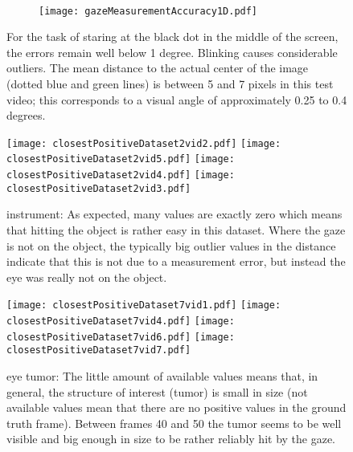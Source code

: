 \begin{figure}[ht]
	\centering
	\begin{subfigure}[h]{0.41\textwidth}
	      \setlength{\fboxsep}{0pt}%
	      \setlength{\fboxrule}{0.5pt}%
	      \centering
	\end{subfigure}
	~
	\begin{subfigure}[h]{0.48\textwidth}
		\texttt{[image: gazeMeasurementAccuracy1D.pdf]}	
	\end{subfigure}
	\caption{For the task of staring at the black dot in the middle of the screen, the errors remain well below 1 degree. Blinking causes considerable outliers. The mean distance to the actual center of the image (dotted blue and green lines) is between 5 and 7 pixels in this test video; this corresponds to a visual angle of approximately 0.25 to 0.4 degrees.}
	\label{fig:gazeMeasurementAccuracy}
\end{figure}


\begin{figure}[ht]
	  \texttt{[image: closestPositiveDataset2vid2.pdf]}
	  \texttt{[image: closestPositiveDataset2vid5.pdf]}
	  \texttt{[image: closestPositiveDataset2vid4.pdf]}
	  \texttt{[image: closestPositiveDataset2vid3.pdf]}
	  \caption{instrument: As expected, many values are exactly zero which means that hitting the object is rather easy in this dataset. Where the gaze is not on the object, the typically big outlier values in the distance indicate that this is not due to a measurement error, but instead the eye was really not on the object.}
	\label{fig:distanceToClosestPositiveD2}
\end{figure}

\begin{figure}[ht]
	  \texttt{[image: closestPositiveDataset7vid1.pdf]}
	  \texttt{[image: closestPositiveDataset7vid4.pdf]}
	  \texttt{[image: closestPositiveDataset7vid6.pdf]}
	  \texttt{[image: closestPositiveDataset7vid7.pdf]}
	  \caption{eye tumor: The little amount of available values means that, in general, the structure of interest (tumor) is small in size (not available values mean that there are no positive values in the ground truth frame). Between frames 40 and 50 the tumor seems to be well visible and big enough in size to be rather reliably hit by the gaze.}
	\label{fig:distanceToClosestPositiveD7}
\end{figure}

